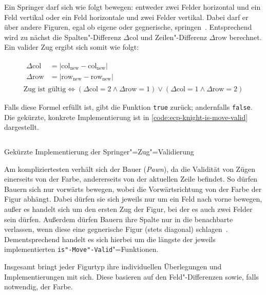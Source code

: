 Ein Springer darf sich wie folgt bewegen: entweder zwei Felder horizontal und ein Feld vertikal oder ein Feld horizontale und zwei Felder vertikal. Dabei darf er über andere Figuren, egal ob eigene oder gegnerische, springen~\cite{justUSChessFederations2019}. Entsprechend wird zu nächst die Spalten"-Differenz $\Delta\text{col}$ und Zeilen"-Differenz $\Delta\text{row}$ berechnet. Ein valider Zug ergibt sich somit wie folgt:

\vspace{-1em}
\begin{gather*}
    \begin{aligned}
        \Delta\text{col} &= \vert \text{col}_{\text{new}} - \text{col}_{\text{new}} \vert \\
        \Delta\text{row} &= \vert \text{row}_{\text{new}} - \text{row}_{\text{new}} \vert
    \end{aligned}
    \\
    \text{Zug ist gültig} \iff (\Delta\text{col} = 2 \land \Delta\text{row} = 1) \lor (\Delta\text{col} = 1 \land \Delta\text{row} = 2)
\end{gather*}

Falls diese Formel erfüllt ist, gibt die Funktion \texttt{true} zurück; andernfalls \texttt{false}. Die gekürzte, konkrete Implementierung ist in \autoref{code:ecp-knight-is-move-valid} dargestellt.

\begin{listing}[h]
    \inputminted{cpp}{../assets/code/ECPKnight::isMoveValid.cpp}
    \caption{Gekürzte Implementierung der Springer"=Zug"=Validierung}
    \label{code:ecp-knight-is-move-valid}
\end{listing}

Am kompliziertesten verhält sich der Bauer (\emph{Pawn}), da die Validität von Zügen einerseits von der Farbe, andererseits von der aktuellen Zeile befindet. So dürfen Bauern sich nur vorwärts bewegen, wobei die Vorwärtsrichtung von der Farbe der Figur abhängt. Dabei dürfen sie sich jeweils nur um ein Feld nach vorne bewegen, außer es handelt sich um den ersten Zug der Figur, bei der es auch zwei Felder sein dürfen. Außerdem dürfen Bauern ihre Spalte nur in die benachbarte verlassen, wenn diese eine gegnerische Figur (stets diagonal) schlagen~\cite{justUSChessFederations2019}. Dementsprechend handelt es sich hierbei um die längste der jeweils implementierten \texttt{is"-Move"-Valid}"=Funktionen.

Insgesamt bringt jeder Figurtyp ihre individuellen Überlegungen und Implementierungen mit sich. Diese basieren auf den Feld"-Differenzen sowie, falls notwendig, der Farbe.
